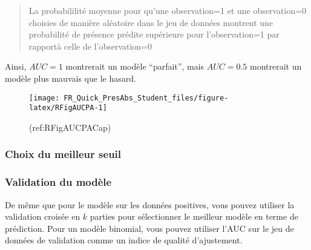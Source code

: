 \documentclass[french,a4paper]{article}
\begin{document}
\begin{quote}
La probabililité moyenne pour qu'une observation=1 et une observation=0
choisies de manière aléatoire dans le jeu de données montrent une
probabilité de présence prédite supérieure pour l'observation=1 par
rapportà celle de l'observation=0
\end{quote}

Ainsi, \(AUC = 1\) montrerait un modèle ``parfait'', mais \(AUC = 0.5\)
montrerait un modèle plus mauvais que le hasard.

\begin{figure}[!h]

{\centering \texttt{[image: FR\_Quick\_PresAbs\_Student\_files/figure-latex/RFigAUCPA-1]} 

}

\caption{(ref:RFigAUCPACap)}\label{fig:RFigAUCPA}
\end{figure}

\hypertarget{choix-du-meilleur-seuil}{%
\subsubsection{Choix du meilleur seuil}\label{choix-du-meilleur-seuil}}

\hypertarget{validation-du-modele}{%
\subsubsection{Validation du modèle}\label{validation-du-modele}}

De même que pour le modèle sur les données positives, vous pouvez
utiliser la validation croisée en \(k\) parties pour sélectionner le
meilleur modèle en terme de prédiction. Pour un modèle binomial, vous
pouvez utiliser l'AUC sur le jeu de données de validation comme un
indice de qualité d'ajustement.
\end{document}
